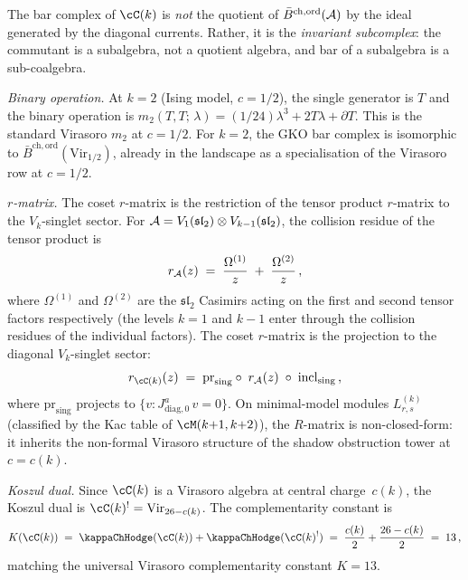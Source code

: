 \begin{computation}
The bar complex of $\cC(k)$ is \emph{not} the quotient of
$\bar{B}^{\mathrm{ch,ord}}(\mathcal{A})$ by the ideal generated by the
diagonal currents. Rather, it is the \emph{invariant
subcomplex}: the commutant is a subalgebra, not a quotient
algebra, and bar of a subalgebra is a sub-coalgebra.

\smallskip
\noindent
\emph{Binary operation.}
At $k = 2$ (Ising model, $c = 1/2$), the single generator
is $T$ and the binary operation is
$m_2(T, T;\, \lambda) = (1/24)\lambda^3 + 2T\lambda
+ \partial T$.
This is the standard Virasoro $m_2$ at $c = 1/2$.
For $k = 2$, the GKO bar complex is isomorphic to
$\bar{B}^{\mathrm{ch,ord}}(\mathrm{Vir}_{1/2})$, already
in the landscape as a specialisation of the Virasoro
row at $c = 1/2$.

\smallskip
\noindent
\emph{$r$-matrix.}
The coset $r$-matrix is the restriction of the tensor
product $r$-matrix to the $V_k$-singlet sector.
For $\mathcal{A} = V_1(\mathfrak{sl}_2) \otimes V_{k-1}(\mathfrak{sl}_2)$,
the collision residue of the tensor product is
\[
r_{\mathcal{A}}(z)
\;=\;
\frac{\Omega^{(1)}}{z}
\;+\;
\frac{\Omega^{(2)}}{z}\,,
\]
where $\Omega^{(1)}$ and $\Omega^{(2)}$ are the
$\mathfrak{sl}_2$ Casimirs acting on the first and
second tensor factors respectively (the levels $k = 1$
and $k - 1$ enter through the collision residues of the
individual factors). The coset $r$-matrix is the
projection to the diagonal $V_k$-singlet sector:
\begin{equation}\label{eq:gko-r-matrix}
r_{\cC(k)}(z)
\;=\;
\mathrm{pr}_{\mathrm{sing}}
\circ\; r_\cA(z)
\;\circ\; \mathrm{incl}_{\mathrm{sing}}\,,
\end{equation}
where $\mathrm{pr}_{\mathrm{sing}}$ projects to
$\{v : J^a_{\mathrm{diag},0}\, v = 0\}$.
On minimal-model modules $L_{r,s}^{(k)}$ (classified
by the Kac table of $\cM(k{+}1, k{+}2)$), the $R$-matrix
is non-closed-form: it inherits the non-formal Virasoro
structure of the shadow obstruction tower at $c = c(k)$.

\smallskip
\noindent
\emph{Koszul dual.}
Since $\cC(k)$ is a Virasoro algebra at central
charge~$c(k)$, the Koszul dual is
$\cC(k)^! = \mathrm{Vir}_{26 - c(k)}$.
The complementarity constant is
\begin{equation}\label{eq:gko-complementarity}
K(\cC(k))
\;=\;
\kappaChHodge(\cC(k)) + \kappaChHodge(\cC(k)^!)
\;=\;
\frac{c(k)}{2} + \frac{26 - c(k)}{2}
\;=\; 13\,,
\end{equation}
matching the universal Virasoro complementarity constant
$K = 13$.


\end{computation}
